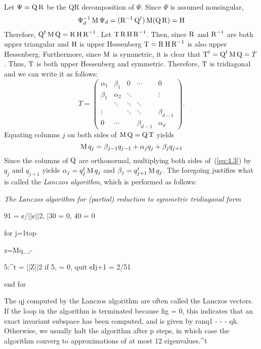 Let $\Psi = \operatorname{Q}\operatorname{R}$ be the QR decomposition of $\Psi$. Since $\Psi$ is assumed nonsingular,
\[
\Psi_d^{-1}\operatorname{M} \Psi_d = (\operatorname{R}^{-1}\operatorname{Q}^t)\operatorname{M}(\operatorname{Q}\operatorname{R}) = \operatorname{H}
\]
Therefore, $\operatorname{Q}^t\operatorname{M}\operatorname{Q} = \operatorname{R}\operatorname{H}\operatorname{R}^{-1}$.  Let $\operatorname{T} \operatorname{R}\operatorname{H}\operatorname{R}^{-1}$.  Then, since $\operatorname{R}$
and $\operatorname{R}^{-1}$ are both upper triangular and $\operatorname{H}$ is upper Hessenberg $\operatorname{T} = \operatorname{R}\operatorname{H}\operatorname{R}^{-1}$ is also upper
Hessenberg. Furthermore, since $\operatorname{M}$ is symmetric, it is clear that 
$\operatorname{T}^t =\operatorname{Q}^t\operatorname{M}\operatorname{Q} = T$. Thus, $\operatorname{T}$ is both upper Hessenberg and symmetric. Therefore,
$\operatorname{T}$ is tridiagonal and we can write it as follows:
\begin{equation}
  \label{eq:4.2}
T = 
\begin{pmatrix}
\alpha_1 & \beta_1 &      0 & \cdots & 0 \\
\beta_1  & \alpha_2 & \ddots &        & \vdots\\
         & \ddots & \ddots & \ddots   &\\
\vdots   &       &  \ddots & \ddots & \beta_{d-1}\\
0  &   \cdots    &   & \beta_{d-1} &\alpha_d
\end{pmatrix}.
\end{equation}
%
%
%
%
Equating columns $j$ on both sides of $\operatorname{M}\operatorname{Q} = \operatorname{Q}\operatorname{T}$ yields
\begin{equation}
\label{eq:4.3}
\operatorname{M} q_j = \beta_{j-1}q_{j-1}+\alpha_j q_j + \beta_j q_{j+1}
\end{equation}
Since the columns of $\operatorname{Q}$ are orthonormal, multiplying both sides 
of~(\ref{eq:4.3})
by $q_j$ and $q_{j+1}$ yields
$\alpha_j = q_j^t \operatorname{M} q_j$ and $\beta_j = q_{j+1}^t \operatorname{M} q_j$.
The foregoing justifies what is called the \emph{Lanczos algorithm}, which is performed as follows:

\emph{The Lanczos algorithm for (partial) reduction to symmetric tridiaganal form}

91 = ¢/||¢||2, [30 = 0, 40 = 0

for j=1top

z=Mq_,-

5:^t = ||Z||2
if 5, = 0, quit
¢Ij+1 = 2/51

end for

The qj computed by the Lanczos algorithm are often called the Lanczos vectors. If the
loop in the algorithm is terminated because fig = 0, this indicates that an exact invariant subspace
has been computed, and is given by ran{q1 - - - qk}. Otherwise, we usually halt the algorithm after
p steps, in which case the algorithm converg to approximations of at most 12 eigenvalues.^t

